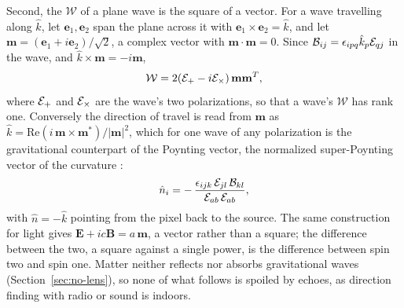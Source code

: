 Second, the $\mathcal{W}$ of a plane wave is the square of a vector. For a wave travelling along $\hat k$,
let $\mathbf{e}_1, \mathbf{e}_2$ span the plane across it with
$\mathbf{e}_1\times\mathbf{e}_2 = \hat k$, and let
$\mathbf{m} = (\mathbf{e}_1 + i\mathbf{e}_2)/\sqrt2$, a complex vector with
$\mathbf{m}\cdot\mathbf{m} = 0$. Since $\mathcal{B}_{ij} = \epsilon_{ipq}\hat k_p\mathcal{E}_{qj}$ in
the wave, and $\hat k\times\mathbf{m} = -i\mathbf{m}$,
\begin{equation}\label{eq:square}
\mathcal{W} = 2(\mathcal{E}_+ - i\mathcal{E}_\times)\,\mathbf{m}\mathbf{m}^{T},
\end{equation}
where $\mathcal{E}_+$ and $\mathcal{E}_\times$ are the wave's two polarizations, so that a wave's
$\mathcal{W}$ has rank one. Conversely the direction of travel is read from $\mathbf{m}$
as $\hat k = \mathrm{Re}(i\,\mathbf{m}\times\mathbf{m}^*)/|\mathbf{m}|^2$, which for
one wave of any polarization is the gravitational counterpart of the Poynting
vector, the normalized super-Poynting vector of the curvature
\cite{MaartensBassett1998}:
\begin{equation}\label{eq:one-wave}
\hat n_i = -\,\frac{\epsilon_{ijk}\,\mathcal{E}_{jl}\,\mathcal{B}_{kl}}{\mathcal{E}_{ab}\,\mathcal{E}_{ab}} ,
\end{equation}
with $\hat n = -\hat k$ pointing from the pixel back to the source. The same
construction for light gives $\mathbf{E} + ic\mathbf{B} = a\,\mathbf{m}$, a vector
rather than a square; the difference between the two, a square against a single
power, is the difference between spin two and spin one. Matter neither reflects nor absorbs gravitational waves
(Section~\ref{sec:no-lens}), so none of what follows is spoiled by echoes, as
direction finding with radio or sound is indoors.

